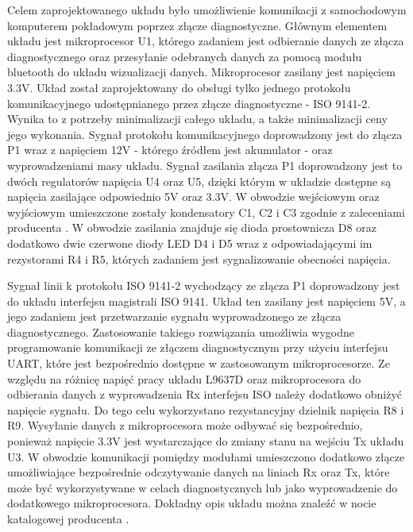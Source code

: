 \documentclass[12pt]{article} %
\numberwithin{equation}{subsection}
\numberwithin{figure}{section}
\numberwithin{table}{section}
\begin{document}
		\hspace{0.5cm}Celem zaprojektowanego układu było umożliwienie komunikacji z samochodowym komputerem pokładowym poprzez złącze diagnostyczne. Głównym elementem układu jest mikroprocesor U1, którego zadaniem jest odbieranie danych ze złącza diagnostycznego oraz przesyłanie odebranych danych za pomocą modułu bluetooth do układu wizualizacji danych. Mikroprocesor zasilany jest napięciem 3.3V. Układ został zaprojektowany do obsługi tylko jednego protokołu komunikacyjnego udostępnianego przez złącze diagnostyczne - ISO 9141-2. Wynika to z potrzeby minimalizacji całego układu, a także minimalizacji ceny jego wykonania. Sygnał protokołu komunikacyjnego doprowadzony jest do złącza P1 wraz z napięciem 12V - którego źródłem jest akumulator - oraz wyprowadzeniami masy układu. Sygnał zasilania złącza P1 doprowadzony jest to dwóch regulatorów napięcia U4 oraz U5, dzięki którym w układzie dostępne są napięcia zasilające odpowiednio 5V oraz 3.3V. W obwodzie wejściowym oraz wyjściowym umieszczone zostały kondensatory C1, C2 i C3 zgodnie z zaleceniami producenta \cite{MC7805}\cite{MCP17}. W obwodzie zasilania znajduje się dioda prostownicza D8 oraz dodatkowo dwie czerwone diody LED D4 i D5 wraz z odpowiadającymi im rezystorami R4 i R5, których zadaniem jest sygnalizowanie obecności napięcia.
		
		Sygnał linii k protokołu ISO 9141-2 wychodzący ze złącza P1 doprowadzony jest do układu interfejsu magistrali ISO 9141. Układ ten zasilany jest napięciem 5V, a jego zadaniem jest przetwarzanie sygnału wyprowadzonego ze złącza diagnostycznego. Zastosowanie takiego rozwiązania umożliwia wygodne programowanie komunikacji ze złączem diagnostycznym przy użyciu interfejsu UART, które  jest bezpośrednio dostępne w zastosowanym mikroprocesorze. Ze względu na różnicę napięć pracy układu L9637D oraz mikroprocesora do odbierania danych z wyprowadzenia Rx interfejsu ISO należy dodatkowo obniżyć napięcie sygnału. Do tego celu wykorzystano rezystancyjny dzielnik napięcia R8 i R9. Wysyłanie danych z mikroprocesora może odbywać się bezpośrednio, ponieważ napięcie 3.3V jest wystarczające do zmiany stanu na wejściu Tx układu U3. W obwodzie komunikacji pomiędzy modułami umieszczono dodatkowo złącze umożliwiające bezpośrednie odczytywanie danych na liniach Rx oraz Tx, które może być wykorzystywane w celach diagnostycznych lub jako wyprowadzenie do dodatkowego mikroprocesora. Dokładny opis układu można znaleźć w nocie katalogowej producenta \cite{L9637D}.
		
\end{document}
